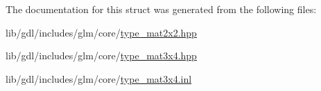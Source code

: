 The documentation for this struct was generated from the following files\+:\begin{DoxyCompactItemize}
\item 
lib/gdl/includes/glm/core/\hyperlink{type__mat2x2_8hpp}{type\+\_\+mat2x2.\+hpp}\item 
lib/gdl/includes/glm/core/\hyperlink{type__mat3x4_8hpp}{type\+\_\+mat3x4.\+hpp}\item 
lib/gdl/includes/glm/core/\hyperlink{type__mat3x4_8inl}{type\+\_\+mat3x4.\+inl}\end{DoxyCompactItemize}
